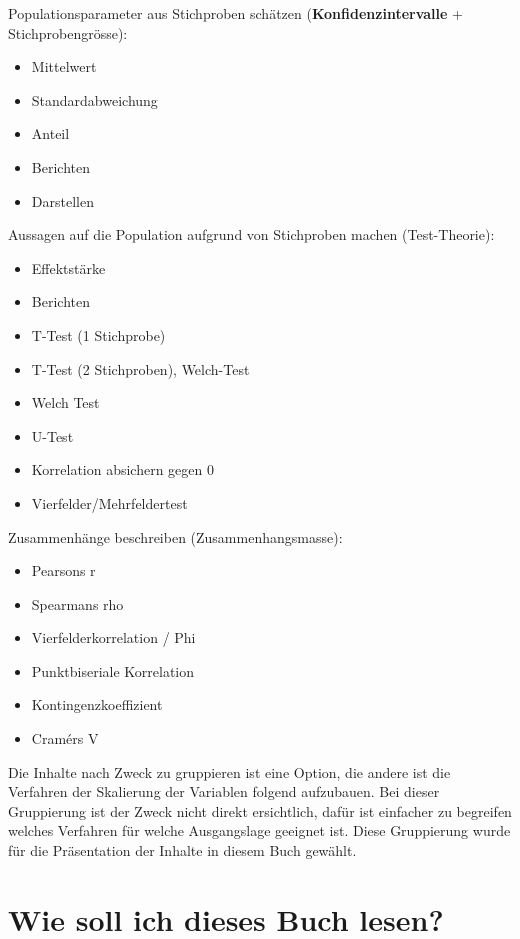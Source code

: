 \documentclass[
]{book}
\providecommand{\tightlist}{%
  \setlength{\itemsep}{0pt}\setlength{\parskip}{0pt}}
\theoremstyle{definition}
\theoremstyle{definition}
\theoremstyle{definition}
\theoremstyle{definition}
\theoremstyle{remark}
\begin{document}
Populationsparameter aus Stichproben schätzen (\textbf{Konfidenzintervalle} + Stichprobengrösse):

\begin{itemize}
\tightlist
\item
  Mittelwert
\item
  Standardabweichung
\item
  Anteil
\item
  Berichten
\item
  Darstellen
\end{itemize}

Aussagen auf die Population aufgrund von Stichproben machen (Test-Theorie):

\begin{itemize}
\tightlist
\item
  Effektstärke
\item
  Berichten
\item
  T-Test (1 Stichprobe)
\item
  T-Test (2 Stichproben), Welch-Test
\item
  Welch Test
\item
  U-Test
\item
  Korrelation absichern gegen 0
\item
  Vierfelder/Mehrfeldertest
\end{itemize}

Zusammenhänge beschreiben (Zusammenhangsmasse):

\begin{itemize}
\tightlist
\item
  Pearsons r
\item
  Spearmans rho
\item
  Vierfelderkorrelation / Phi
\item
  Punktbiseriale Korrelation
\item
  Kontingenzkoeffizient
\item
  Cramérs V
\end{itemize}

Die Inhalte nach Zweck zu gruppieren ist eine Option, die andere ist die Verfahren der Skalierung der Variablen folgend aufzubauen. Bei dieser Gruppierung ist der Zweck nicht direkt ersichtlich, dafür ist einfacher zu begreifen welches Verfahren für welche Ausgangslage geeignet ist. Diese Gruppierung wurde für die Präsentation der Inhalte in diesem Buch gewählt.

\section{Wie soll ich dieses Buch lesen?}\label{buch-lesen}
\end{document}
